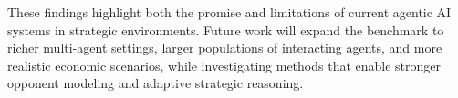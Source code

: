 \documentclass[conference]{IEEEtran}
\begin{document}
These findings highlight both the promise and limitations of current agentic AI systems in strategic environments. Future work will expand the benchmark to richer multi-agent settings, larger populations of interacting agents, and more realistic economic scenarios, while investigating methods that enable stronger opponent modeling and adaptive strategic reasoning.

\end{document}
